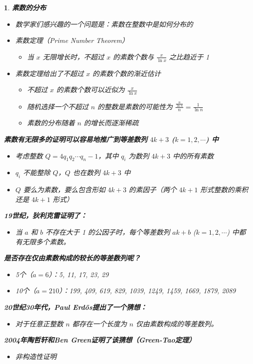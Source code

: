 \documentclass[UTF8]{report}
\theoremstyle{MyLineTheoremStyle} %
\theoremstyle{MyBlockTheoremStyle} %
\theoremstyle{MySubsubsectionStyle} %
\newtheorem{definition}{}
\begin{document}
\begin{definition}
    \textbf{素数的分布}
    \begin{itemize}
        \item 数学家们感兴趣的一个问题是：素数在整数中是如何分布的
        \item 素数定理（Prime Number Theorem）
        \begin{itemize}
            \item 当 $x$ 无限增长时，不超过 $x$ 的素数个数与 $\frac{x}{\ln x}$ 之比趋近于 1
        \end{itemize}
        \item 素数定理给出了不超过 $x$ 的素数个数的渐近估计
        \begin{itemize}
            \item 不超过 $x$ 的素数个数可以近似为 $\frac{x}{\ln x}$
            \item 随机选择一个不超过 $n$ 的整数是素数的可能性为 $\frac{\frac{n}{\ln n}}{n} = \frac{1}{\ln n}$
            \item 素数的分布随着 $n$ 的增长而逐渐稀疏
        \end{itemize}
    \end{itemize}

    \textbf{素数有无限多的证明可以容易地推广到等差数列 $4k + 3$ ($k = 1,2, \cdots$) 中}
    \begin{itemize}
        \item 考虑整数 $Q = 4q_1q_2 \cdots q_n - 1$，其中 $q_i$ 为数列 $4k + 3$ 中的所有素数
        \item $q_i$ 不能整除 $Q$，$Q$ 也在数列 $4k + 3$ 中
        \item $Q$ 要么为素数，要么包含形如 $4k + 3$ 的素因子（两个 $4k + 1$ 形式整数的乘积还是 $4k + 1$ 形式）
    \end{itemize}

    \textbf{19世纪，狄利克雷证明了：}
    \begin{itemize}
        \item 当 $a$ 和 $b$ 不存在大于 1 的公因子时，每个等差数列 $ak + b$ ($k = 1,2, \cdots$) 中都有无限多个素数。
    \end{itemize}

    \textbf{是否存在仅由素数构成的较长的等差数列呢？}
    \begin{itemize}
        \item 5个（$a = 6$）：5, 11, 17, 23, 29
        \item 10个（$a = 210$）：199, 409, 619, 829, 1039, 1249, 1459, 1669, 1879, 2089
    \end{itemize}

    \textbf{20世纪30年代，Paul Erdős提出了一个猜想：}
    \begin{itemize}
        \item 对于任意正整数 $n$ 都存在一个长度为 $n$ 仅由素数构成的等差数列。
    \end{itemize}

    \textbf{2004年陶哲轩和Ben Green证明了该猜想（Green-Tao定理）}
    \begin{itemize}
        \item 非构造性证明
    \end{itemize}
\end{definition}
\end{document}
